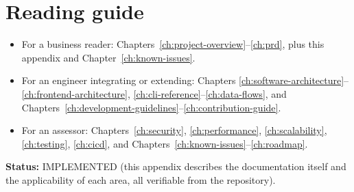 \section{Reading guide}

\begin{itemize}
  \item For a business reader: Chapters~\ref{ch:project-overview}--\ref{ch:prd},
        plus this appendix and Chapter~\ref{ch:known-issues}.
  \item For an engineer integrating or extending: Chapters
        \ref{ch:software-architecture}--\ref{ch:frontend-architecture},
        \ref{ch:cli-reference}--\ref{ch:data-flows}, and
        Chapters~\ref{ch:development-guidelines}--\ref{ch:contribution-guide}.
  \item For an assessor: Chapters~\ref{ch:security}, \ref{ch:performance},
        \ref{ch:scalability}, \ref{ch:testing}, \ref{ch:cicd}, and
        Chapters~\ref{ch:known-issues}--\ref{ch:roadmap}.
\end{itemize}

\textbf{Status:} IMPLEMENTED (this appendix describes the documentation itself and
the applicability of each area, all verifiable from the repository).
